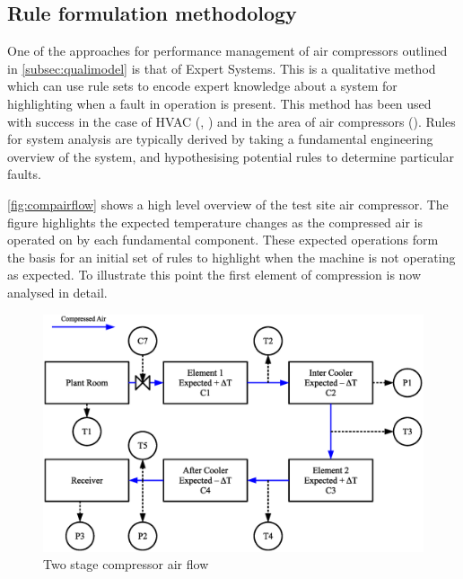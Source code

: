 \subsection{Rule formulation methodology}
\label{subsec:rulemethodology}

One of the approaches for performance management of air compressors outlined in \autoref{subsec:qualimodel} is that of Expert Systems. This is a qualitative method which can use rule sets to encode expert knowledge about a system for highlighting when a fault in operation is present. This method has been used with success in the case of HVAC (\cite{Bruton2014}, \cite{House2001}) and in the area of air compressors (\cite{Jiang2013}). Rules for system analysis are typically derived by taking a fundamental engineering overview of the system, and hypothesising potential rules to determine particular faults.

\autoref{fig:compairflow} shows a high level overview of the test site air compressor. The figure highlights the expected temperature changes as the compressed air is operated on by each fundamental component. These expected operations form the basis for an initial set of rules to highlight when the machine is not operating as expected. To illustrate this point the first element of compression is now analysed in detail.

\begin{figure}
\includegraphics[width = \textwidth]{./Images/2StageRotaryCompressorIdeal.eps}
\caption{Two stage compressor air flow}
\label{fig:compairflow}
\end{figure}

